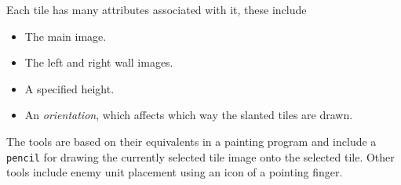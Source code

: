 Each tile has many attributes associated with it, these include 
\begin{itemize}
	\item The main image.
	\item The left and right wall images.
	\item A specified height.
	\item An \emph{orientation}, which affects which way the slanted tiles are drawn.
\end{itemize}

The tools are based on their equivalents in a painting program  and include a \texttt{pencil} for drawing the currently selected tile image onto the selected tile.  Other tools include enemy unit placement using an icon of a pointing finger. 



